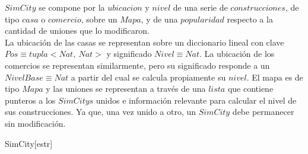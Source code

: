 \begin{Representacion}
  
$SimCity$ se compone por la $ubicacion$ y $nivel$ de una serie de $construcciones$, de tipo $casa$ o $comercio$, sobre un $Mapa$, y de una $popularidad$ respecto a la cantidad de uniones que lo modificaron. \\

La ubicación de las casas se representan sobre un diccionario lineal con clave $Pos \equiv tupla<Nat,\ Nat>$ y significado $Nivel \equiv Nat$. La ubicación de los comercios se representan similarmente, pero su significado responde a un $NivelBase \equiv Nat$ a partir del cual se calcula propiamente su $nivel$. El mapa es de tipo $Mapa$ y las uniones se representan a través de una $lista$ que contiene punteros a los $SimCitys$ unidos e información relevante para calcular el nivel de sus construcciones. Ya que, una vez unido a otro, un $SimCity$ debe permanecer sin modificación. 

\vspace{5mm}

    \begin{Estructura}{SimCity}[estr]
        \begin{Tupla}[estr]
        \end{Tupla}
        
        \vspace{2mm}
        \begin{Tupla}[hijo]
        \end{Tupla}
        
        \vspace{2mm}
        \begin{Tupla}[pos]
        \end{Tupla}
    \end{Estructura}


\end{Representacion}
